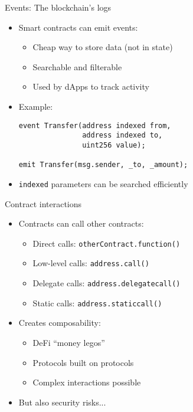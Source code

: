 \documentclass[aspectratio=169, lualatex, handout]{beamer}
\begin{document}
\begin{frame}[fragile]{Events: The blockchain's logs}
	\begin{itemize}
		\item Smart contracts can emit events:
		      \begin{itemize}
			      \item Cheap way to store data (not in state)
			      \item Searchable and filterable
			      \item Used by dApps to track activity
		      \end{itemize}
		\item Example:
		      \begin{verbatim}
event Transfer(address indexed from,
               address indexed to,
               uint256 value);

emit Transfer(msg.sender, _to, _amount);
        \end{verbatim}
		\item \texttt{indexed} parameters can be searched efficiently
	\end{itemize}
\end{frame}

\begin{frame}{Contract interactions}
	\begin{itemize}
		\item Contracts can call other contracts:
		      \begin{itemize}
			      \item Direct calls: \texttt{otherContract.function()}
			      \item Low-level calls: \texttt{address.call()}
			      \item Delegate calls: \texttt{address.delegatecall()}
			      \item Static calls: \texttt{address.staticcall()}
		      \end{itemize}
		\item Creates composability:
		      \begin{itemize}
			      \item DeFi ``money legos''
			      \item Protocols built on protocols
			      \item Complex interactions possible
		      \end{itemize}
		\item But also security risks...
	\end{itemize}
\end{frame}
\end{document}
